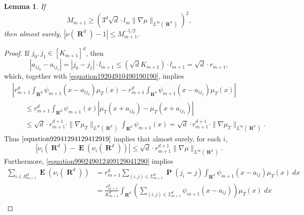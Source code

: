 \documentclass[12pt,reqno]{article}
\newtheorem{lemma}[theorem]{Lemma}
\DeclareMathOperator{\RR}{\mathbf{R}}
\DeclareMathOperator{\EE}{\mathbf{E}}
\DeclareMathOperator{\PP}{\mathbf{P}}
\begin{document}
\begin{lemma} \label{nuNormalizationLemma}
    If
    \begin{equation} \label{equation10491249012}
        M_{m+1} \geq \left( 3^d \sqrt{d} \cdot l_m \| \nabla \mu \|_{L^\infty(\RR^d)} \right)^2,
    \end{equation}
    then almost surely, $|\nu(\RR^d) - 1| \leq M_{m+1}^{-1/2}$.
\end{lemma}
\begin{proof}
    If $j_0, j_1 \in [K_{m+1}]^d$, then
    \[ |a_{ij_0} - a_{ij_1}| = |j_0 - j_1| \cdot l_{m+1} \leq (\sqrt{d} K_{m+1}) \cdot l_{m+1} = \sqrt{d} \cdot r_{m+1}, \]
    which, together with \eqref{equation19204910490190190}, implies
    \begin{equation} \label{equation92941294129412919}
    \begin{split}
        &\left| r_{m+1}^d \int_{\RR^d} \psi_{m+1}(x - a_{ij_0}) \mu_T(x) - r_{m+1}^d \int_{\RR^d} \psi_{m+1}(x - a_{ij_1}) \mu_T(x) \right|\\
        &\ \ \ \ \ \ \ \ \leq r_{m+1}^d \int_{\RR^d} \psi_{m+1}(x) \left| \mu_T(x + a_{ij_0}) - \mu_T(x + a_{ij_1}) \right|\\
        &\ \ \ \ \ \ \ \ \leq \sqrt{d} \cdot r_{m+1}^{d+1} \cdot \| \nabla \mu_T \|_{L^\infty(\RR^d)} \int_{\RR^d} \psi_{m+1}(x) = \sqrt{d} \cdot r_{m+1}^{d+1} \cdot \| \nabla \mu_T \|_{L^\infty(\RR^d)}.
    \end{split}
    \end{equation}
    Thus $\eqref{equation92941294129412919}$ implies that almost surely, for each $i$,
    \begin{equation} \label{equation491040912491}
        |\nu_i(\RR^d) - \EE(\nu_i(\RR^d))| \leq \sqrt{d} \cdot r_{m+1}^{d+1} \| \nabla \mu \|_{L^\infty(\RR^d)}.
    \end{equation}
    Furthermore, \eqref{equation990249012409129041290} implies
    \begin{equation} \label{9921490124912}
    \begin{split}
        \sum_{i \in \Pi_{m+1}^d} \EE(\nu_i(\RR^d)) &= r_{m+1}^d \sum\nolimits_{(i,j) \in \Sigma_{m+1}^d} \PP(j_i = j) \int_{\RR^d} \psi_{m+1}(x - a_{ij}) \mu_T(x)\; dx\\
        &= \frac{r_{m+1}^d}{K_{m+1}^d} \int_{\RR^d} \left( \sum\nolimits_{(i,j) \in \Sigma_{m+1}^d} \psi_{m+1}(x - a_{ij}) \right) \mu_T(x)\; dx\\

\end{split}
\end{equation}
\end{proof}
\end{document}
